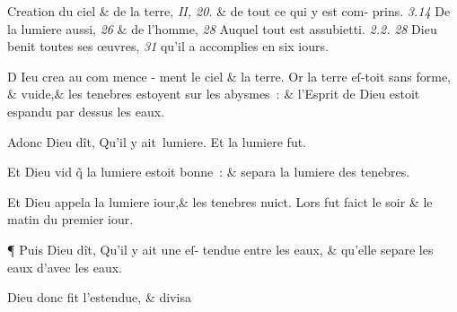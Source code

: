 \bchapter[chapitre]

\begin{chaptercomment}
 \footnotemarkchapter{}Creation du ciel \& de la terre,
 \emph{II, 20.} \& de tout ce qui y est com- \lb
 prins.  \emph{3.14} De la lumiere aussi,
 \emph{26} \& de l'homme,
 \emph{28} {Auquel}\lb
 tout est assubietti.
 \emph{2.2.} \emph{28} Dieu benit toutes ses \oe{}uvres,
 \emph{31} qu'il \lb
 a accomplies en six iours.
\end{chaptercomment}

\vspace{\baselineskip}

\bversenonum \lettrine[lines=10,image=true,loversize=0.05,lraise=-0.03]{D}{}%
 \footnotemarkverse{}Ieu
 \footnotemarkmain{}crea
 \footnotemarkmain{}au com \lb
 mence - ment
 \footnotemarkmain{}le ciel \& la terre.
\bversenopar[]Or la\lb
 terre eſ-\lb toit sans forme, \& \lb
 vuide,\& les tenebres estoyent sur les
abysmes~: \& l'Esprit de Dieu
 \footnotemarkmain{}estoit
 espandu par dessus les eaux.



\bverse Adonc Dieu dît,
 \footnotemarkverse{}Qu'il y ait~lumie\-re.
 \footnotemarkmain{}Et la lumiere fut.

\bverse Et Dieu vid \~q la lumiere estoit bon\-ne~: \& separa la lumiere des tenebres.

\bverse Et Dieu appela la lumiere iour,\& les
 tenebres nuict. Lors fut faict le
 \footnotemarkmain{}soir \& le matin 
 du premier iour.

\bverse ¶ Puis Dieu dît,
 \footnotemarkverse{}Qu'il y ait une
 \footnotemarkmain{}eſ-\lb
 tendue entre les eaux,
 \& qu'elle separe les
 \footnotemarkmain{}eaux d'avec les eaux.

\bverse Dieu donc fit l'estendue, \& divisa\lb

